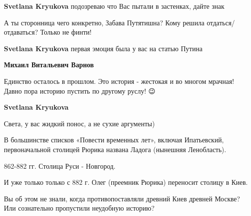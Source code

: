\begin{itemize}
\begin{itemize}
 
\textbf{Svetlana Kryukova} подозреваю что Вас пытали в застенках, дайте знак

 
А ты сторонница чего конкретно, Забава Путятишна? Кому решила отдаться/отдаваться? Только не финти!

 
\textbf{Svetlana Kryukova} первая эмоция была у вас на статью Путина

 
\textbf{Михаил Витальевич Варнов}

Единство осталось в прошлом. Это история - жестокая и во многом мрачная! Давно
пора историю пустить по другому руслу! 😉


 
\textbf{Svetlana Kryukova} 

Света, у вас жидкий понос, а не сухие аргументы)

В большинстве списков «Повести временных лет», включая Ипатьевский,
первоначальной столицей Рюрика названа Ладога (нынешняя Ленобласть).

862-882 гг. Столица Руси - Новгород.

И уже только только с 882 г. Олег (преемник Рюрика) переносит столицу в Киев.

Вы об этом не знали, когда противопоставляли древний Киев древней Москве? Или
сознательно пропустили неудобную историю?


\end{itemize}
\end{itemize}
